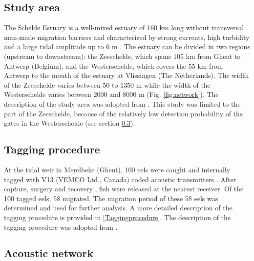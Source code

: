 \documentclass[preprint,12pt,authoryear]{elsarticle}
\begin{document}
\subsection{Study area}

The Schelde Estuary is a well-mixed estuary of 160 km long without transversal man-made migration barriers and characterized by strong currents, high turbidity and a large tidal amplitude up to 6 m \citep{Cornet2016}. The estuary can be divided in two regions (upstream to downstream): the Zeeschelde, which spans 105 km from Ghent to Antwerp (Belgium), and the Westerschelde, which covers the 55 km from Antwerp to the mouth of the estuary at Vlissingen (The Netherlands). The width of the Zeeschelde varies between 50 to 1350 m while the width of the Westerschelde varies between 2000 and 8000 m (Fig. \ref{fig:network}). The description of the study area was adopted from \cite{Bruneel2020QuantifyingSystems}. This study was limited to the part of the Zeeschelde, because of the relatively low detection probability of the gates in the Westerschelde (see section \ref{acousticnetwork}). 

\subsection{Tagging procedure}

At the tidal weir in Merelbeke (Ghent), 100 eels were caught and internally tagged with V13 (VEMCO Ltd., Canada) coded acoustic transmitters \citep{Verhelst2018}. After capture, surgery and recovery \citep{Thorstad2013b}, fish were released at the nearest receiver. Of the 100 tagged eels, 58 migrated. The migration period of these 58 eels was determined \citep{Verhelst2018} and used for further analysis. A more detailed description of the tagging procedure is provided in \ref{Taggingprocedure}. The description of the tagging procedure was adopted from \cite{Bruneel2020QuantifyingSystems}.

\subsection{Acoustic network}
\label{acousticnetwork}
\end{document}
